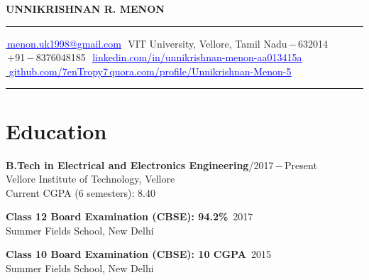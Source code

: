 \documentclass[a4paper, 12pt]{article}
\begin{document}
    \sloppy
  	
    \begin{center}
        \Huge{\textbf{UNNIKRISHNAN R. MENON}}
    \end{center}
    
    \noindent\rule{\textwidth}{1pt}
    \faEnvelope\href{menon.uk1998@gmail.com}{\textcolor{blue}{\,\underline{menon.uk1998@gmail.com}}}\qquad\qquad\qquad\qquad\quad\,\,
        \faMapMarker* VIT University, Vellore, Tamil Nadu\,$-$\,632014\\
        \faPhone\,+91\,$-$\,8376048185\qquad\qquad\qquad\qquad\qquad\qquad\quad
        \faLinkedin\,\,\href{linkedin.com/in/unnikrishnan-menon-aa013415a}{\textcolor{blue}{\underline{linkedin.com/in/unnikrishnan-menon-aa013415a}}}\\
        \faGithub\href{github.com/7enTropy7}{\textcolor{blue}{\,\,\underline{github.com/7enTropy7}}}\qquad\qquad\qquad\qquad\qquad\quad\faQuora\href{quora.com/profile/Unnikrishnan-Menon-5}{\textcolor{blue}{\,\underline{quora.com/profile/Unnikrishnan-Menon-5}}}\\
        \noindent\rule{\textwidth}{1pt}
        
        \section*{Education}
        \begin{flushleft}
        \textbf{B.Tech in Electrical and Electronics Engineering}\qquad\qquad\qquad\qquad\qquad{}/2017\,$-$\,Present\\
        Vellore Institute of Technology, Vellore\\ Current CGPA (6 semesters): 8.40
    \end{flushleft}
    
    \begin{flushleft}
        \textbf{Class 12 Board Examination (CBSE): 94.2\%}\qquad\qquad\qquad\qquad\qquad\qquad\qquad\qquad\, 2017\\Summer Fields School, New Delhi
    \end{flushleft}
    
    \begin{flushleft}
        \textbf{Class 10 Board Examination (CBSE): 10 CGPA}\qquad\qquad\qquad\qquad\qquad\qquad\qquad\, 2015\\Summer Fields School, New Delhi
    \end{flushleft}
    
\end{document}
